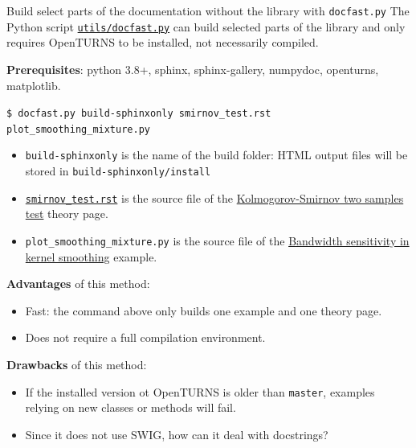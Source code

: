 \documentclass[8pt]{beamer}
\begin{document}
\begin{frame}{Build select parts of the documentation without the library with \texttt{docfast.py}}
The Python script \href{https://github.com/openturns/openturns/blob/master/utils/docfast.py}{\texttt{utils/\alert{docfast.py}}} can build selected parts of the library and only requires OpenTURNS to be installed, not necessarily compiled.

\textbf{Prerequisites}: python 3.8+, sphinx, sphinx-gallery, numpydoc, openturns, matplotlib.

\texttt{\$ docfast.py build-sphinxonly smirnov\_test.rst plot\_smoothing\_mixture.py}

\begin{itemize}
    \item \texttt{build-sphinxonly} is the name of the \alert{build folder}: HTML output files will be stored in \texttt{build-sphinxonly/install}
    \item \href{https://github.com/openturns/openturns/blob/master/python/doc/theory/data_analysis/smirnov_test.rst}{\texttt{smirnov\_test.rst}} is the source file of the \href{https://openturns.github.io/openturns/master/theory/data_analysis/smirnov_test.html}{\alert{Kolmogorov-Smirnov two samples test}} theory page.
    \item \texttt{plot\_smoothing\_mixture.py} is the source file of the
    \href{https://github.com/openturns/openturns/blob/master/python/doc/examples/data_analysis/distribution_fitting/plot_smoothing_mixture.py}{\alert{Bandwidth sensitivity in kernel smoothing}} example.
\end{itemize}

\textbf{Advantages} of this method:
\begin{itemize}
    \item \alert{Fast}: the command above only builds one example and one theory page.
    \item Does \alert{not} require a \alert{full compilation} environment.
\end{itemize}

\textbf{Drawbacks} of this method:
\begin{itemize}
    \item If the installed version ot OpenTURNS is older than \texttt{master}, examples relying on \alert{new classes or methods will fail}.
    \item Since it does not use SWIG, \alert{how can it deal with docstrings?}
\end{itemize}

\end{frame}
\end{document}
